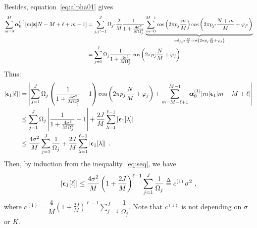 \documentclass[journal,onecolumn]{IEEEtran}
\begin{document}
Besides, equation~\eqref{eq:alpha01} gives
\begin{align*}
\sum_{m=0}^{M}\boldsymbol{\alpha}_0^{(1)}[m]{\mathbf z}[N-M+\ell+m-1] &=\sum_{j,j'=1}^J\Omega_{j'}\dfrac{2}{M}\dfrac1{1+\frac{4\sigma^2}{M\Omega_j^2}}\underbrace{\sum_{m=0}^{M-1}\cos\left(2\pi p_j\frac{m}{M}\right)\cos\left(2\pi p_{j'}\dfrac{N+m}{M}+\varphi_{j'}\right)}_{=\delta_{j,j'}\frac{M}2\cos\left(2\pi p_j\frac{N}M +\varphi_{j}\right)} \\
&= \sum_{j=1}^J\Omega_j\dfrac1{1+\frac{4\sigma^2}{M\Omega_j^2}}\cos\left(2\pi p_j\dfrac{N}{M}+\varphi_j\right)\ .
\end{align*}
Thus:
\begin{align}
\nonumber
\left|\bepsilon_1[\ell]\right| &= \left|\sum_{j=1}^J\Omega_j\left(\dfrac1{1+\frac{4\sigma^2}{M\Omega_j^2}}-1\right)\cos\left(2\pi p_j\dfrac{N}{M}+\varphi_j\right) +\sum_{m=M-\ell+1}^{M-1}\balpha_0^{(1)}[m]\bepsilon_1[m-M+\ell]\right| \\
\nonumber
&\leq \sum_{j=1}^J\Omega_j\left|\dfrac1{1+\frac{4\sigma^2}{M\Omega_j^2}}-1\right| +\dfrac{2J}{M}\sum_{\lambda=1}^{\ell-1}\left|\bepsilon_1[\lambda]\right| \\
&\leq \dfrac{4\sigma^2}{M}\sum_{j=1}^J\dfrac1{\Omega_j} +\dfrac{2J}{M}\sum_{\lambda=1}^{\ell-1}\left|\bepsilon_1[\lambda]\right|\ .
\label{eq:seq}
\end{align}
Then, by induction from the inequality~\eqref{eq:seq}, we have
\begin{equation}
\left|\bepsilon_1[\ell]\right| \leq \dfrac{4\sigma^2}{M}\left(1+\frac{2J}{M}\right)^{\ell-1}\sum_{j=1}^J\dfrac1{\Omega_j} \defeq c^{(1)}\,\sigma^2\ ,
\label{eq:eps1}
\end{equation}
where $c^{(1)}=\dfrac{4}{M}\left(1+\frac{2J}{M}\right)^{\ell-1}\sum_{j=1}^J\dfrac1{\Omega_j}$. Note that $c^{(1)}$ is not depending on $\sigma$ or $K$.
\end{document}
